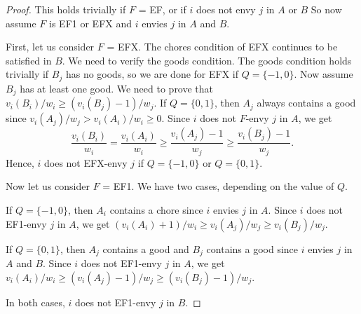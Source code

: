 \begin{proof}
This holds trivially if $F$ = EF, or if $i$ does not envy $j$ in $A$ or $B$
So now assume $F$ is EF1 or EFX and $i$ envies $j$ in $A$ and $B$.

First, let us consider $F$ = EFX.
The chores condition of EFX continues to be satisfied in $B$. We need to verify the goods condition.
The goods condition holds trivially if $B_j$ has no goods, so we are done for EFX if $Q = \{-1, 0\}$.
Now assume $B_j$ has at least one good. We need to prove that $v_i(B_i)/w_i \ge (v_i(B_j)-1)/w_j$.
If $Q = \{0, 1\}$, then $A_j$ always contains a good since $v_i(A_j)/w_j > v_i(A_i)/w_i \ge 0$.
Since $i$ does not $F$-envy $j$ in $A$, we get
\[ \frac{v_i(B_i)}{w_i} = \frac{v_i(A_i)}{w_i} \ge \frac{v_i(A_j)-1}{w_j} \ge \frac{v_i(B_j)-1}{w_j}. \]
Hence, $i$ does not EFX-envy $j$ if $Q = \{-1, 0\}$ or $Q = \{0, 1\}$.

Now let us consider $F$ = EF1. We have two cases, depending on the value of $Q$.
\begin{tightenum}
\item If $Q = \{-1, 0\}$, then $A_i$ contains a chore since $i$ envies $j$ in $A$.
    Since $i$ does not EF1-envy $j$ in $A$, we get $(v_i(A_i) + 1)/w_i \ge v_i(A_j)/w_j \ge v_i(B_j)/w_j$.
\item If $Q = \{0, 1\}$, then $A_j$ contains a good and $B_j$ contains a good since $i$ envies $j$ in $A$ and $B$.
    Since $i$ does not EF1-envy $j$ in $A$, we get $v_i(A_i)/w_i \ge (v_i(A_j) - 1)/w_j \ge (v_i(B_j) - 1)/w_j$.
\end{tightenum}
In both cases, $i$ does not EF1-envy $j$ in $B$.
\end{proof}

